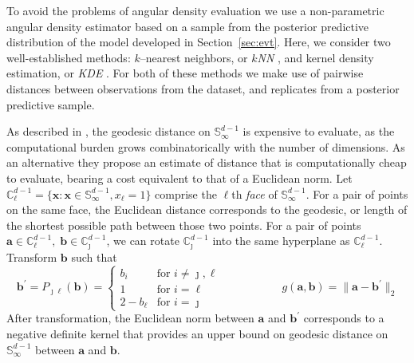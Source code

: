 To avoid the problems of angular density evaluation we use a 
    non-parametric angular density estimator based on a sample from the 
    posterior predictive distribution of the model developed in 
    Section~\ref{sec:evt}. Here, we consider two well-established
    methods: $k$--nearest neighbors, or \emph{$k$NN} \citep{mack1979}, and 
    kernel density estimation, or \emph{KDE} \citep{parzen1962}.  For both of 
    these methods we make use of pairwise distances between observations 
    from the dataset, and replicates from a posterior predictive sample.  

As described in \cite{trubey:pg}, the  geodesic distance on 
    $\mathbb{S}_{\infty}^{d-1}$ 
    is expensive to evaluate, as the computational burden grows 
    combinatorically with the number of dimensions.  As an alternative they propose an 
    estimate of distance that is computationally cheap to evaluate, bearing 
    a cost equivalent to that of a Euclidean norm.
    Let
    ${\mathbb C}_{\ell}^{d-1} = \lbrace \bm{x} : 
        \bm{x} \in {\mathbb S}_{\infty}^{d-1}, x_{\ell} = 1\rbrace$
    comprise the $\ell$th \emph{face} of $\mathbb{S}_{\infty}^{d-1}$.  For a 
    pair of points on the same face, the Euclidean distance corresponds to the
    geodesic, or length of the shortest possible path between those two points.  
    For a pair of points 
    $\bm{a} \in \mathbb{C}_{\ell}^{d-1},\;\bm{b}\in\mathbb{C}_{\jmath}^{d-1}$,
    we can rotate $\mathbb{C}_{\jmath}^{d-1}$ into the same hyperplane as 
    $\mathbb{C}_{\ell}^{d-1}$.  Transform $\bm{b}$ such that %
    \begin{equation}
        \label{eqn:rotation}
        \bm{b}^{\prime} = P_{\jmath\ell}(\bm{b}) = 
        \begin{cases}
            b_{i} &\text{for }i\neq \jmath,\ell\\
            1 &\text{for }i = \ell\\
            2 - b_{\ell} &\text{for }i = \jmath
        \end{cases}\;\hspace{2cm}\;
        g(\bm{a},\bm{b}) = \lVert \bm{a} - \bm{b}^{\prime}\rVert_2
    \end{equation}
    After transformation, the Euclidean norm between $\bm{a}$ and 
    $\bm{b}^{\prime}$ corresponds to a negative definite kernel that
    provides an upper bound on geodesic distance on 
    $\mathbb{S}_{\infty}^{d-1}$ between $\bm{a}$ and $\bm{b}$.


